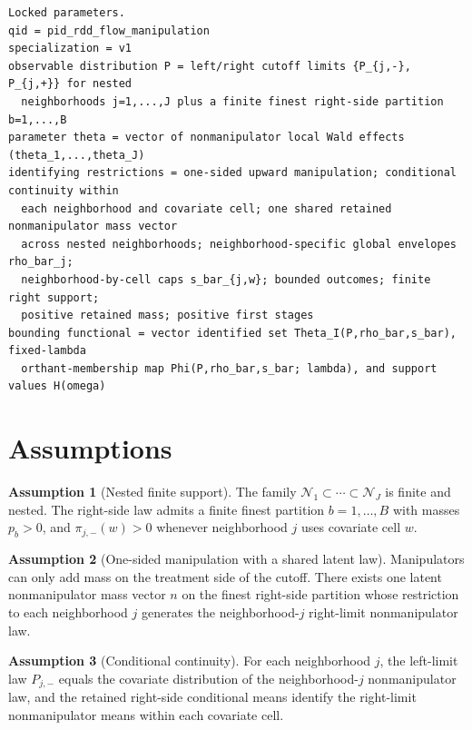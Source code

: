 \documentclass[11pt]{article}
\theoremstyle{definition}
\newtheorem{assumption}{Assumption}
\theoremstyle{plain}
\theoremstyle{remark}
\begin{document}
\begin{verbatim}
Locked parameters.
qid = pid_rdd_flow_manipulation
specialization = v1
observable distribution P = left/right cutoff limits {P_{j,-}, P_{j,+}} for nested
  neighborhoods j=1,...,J plus a finite finest right-side partition b=1,...,B
parameter theta = vector of nonmanipulator local Wald effects (theta_1,...,theta_J)
identifying restrictions = one-sided upward manipulation; conditional continuity within
  each neighborhood and covariate cell; one shared retained nonmanipulator mass vector
  across nested neighborhoods; neighborhood-specific global envelopes rho_bar_j;
  neighborhood-by-cell caps s_bar_{j,w}; bounded outcomes; finite right support;
  positive retained mass; positive first stages
bounding functional = vector identified set Theta_I(P,rho_bar,s_bar), fixed-lambda
  orthant-membership map Phi(P,rho_bar,s_bar; lambda), and support values H(omega)
\end{verbatim}

\section{Assumptions}
\begin{assumption}[Nested finite support]\label{ass:nested-support}
The family \(\mathcal N_1\subset\cdots\subset\mathcal N_J\) is finite and nested. The right-side
law admits a finite finest partition \(b=1,\ldots,B\) with masses \(p_b>0\), and
\(\pi_{j,-}(w)>0\) whenever neighborhood \(j\) uses covariate cell \(w\).
\end{assumption}

\begin{assumption}[One-sided manipulation with a shared latent law]\label{ass:shared-law}
Manipulators can only add mass on the treatment side of the cutoff. There exists one latent
nonmanipulator mass vector \(n\) on the finest right-side partition whose restriction to each
neighborhood \(j\) generates the neighborhood-\(j\) right-limit nonmanipulator law.
\end{assumption}

\begin{assumption}[Conditional continuity]\label{ass:conditional-continuity}
For each neighborhood \(j\), the left-limit law \(P_{j,-}\) equals the covariate distribution
of the neighborhood-\(j\) nonmanipulator law, and the retained right-side conditional means
identify the right-limit nonmanipulator means within each covariate cell.
\end{assumption}
\end{document}
